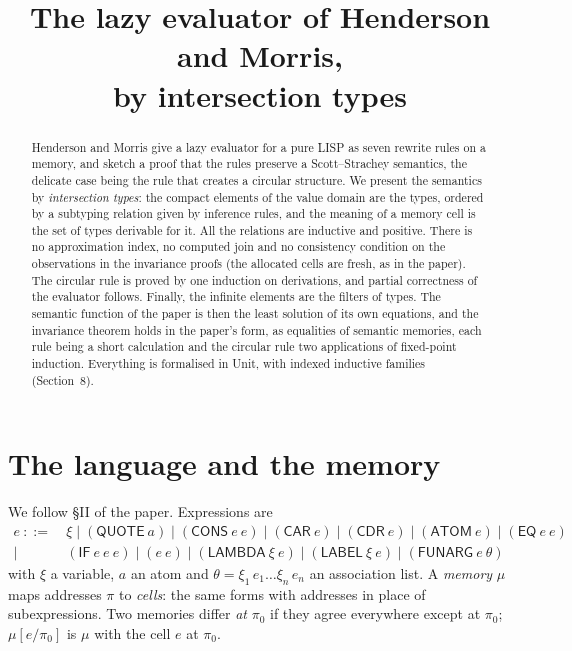 \documentclass[11pt]{amsart}
\title[The lazy evaluator by intersection types]{The lazy evaluator of Henderson and Morris,\\ by intersection types}
\date{}
\theoremstyle{definition}
\theoremstyle{remark}
\newcommand{\kw}[1]{\mathsf{#1}}
\begin{document}
\begin{abstract}
Henderson and Morris \cite{HM76} give a lazy
evaluator for a pure LISP as seven rewrite rules on a memory, and sketch a
proof that the rules preserve a Scott--Strachey semantics, the delicate
case being the rule that creates a circular structure. We present the
semantics by \emph{intersection types}: the compact elements of the value
domain are the types, ordered by a subtyping relation given by inference
rules, and the meaning of a memory cell is the set of types derivable for
it. All the relations are inductive and positive. There is no
approximation index, no computed join and no consistency condition on the
observations in the invariance proofs (the allocated cells are fresh, as in
the paper). The circular rule is proved by one induction on
derivations, and partial correctness of the evaluator follows.
Finally, the infinite elements are the filters of types. The semantic
function of the paper is then the least solution of its own equations, and
the invariance theorem holds in the paper's form, as equalities of semantic
memories, each rule being a short calculation and the circular rule two
applications of fixed-point induction. Everything is formalised in Unit,
with indexed inductive families (Section~8).
\end{abstract}
\maketitle

\section{The language and the memory}

We follow \S II of the paper. Expressions are
\[
\begin{aligned}
e\ ::=\ {}&\xi \mid (\kw{QUOTE}\ a)\mid(\kw{CONS}\ e\ e)\mid(\kw{CAR}\ e)\mid(\kw{CDR}\ e)\mid(\kw{ATOM}\ e)\mid(\kw{EQ}\ e\ e)\\
\mid{}&(\kw{IF}\ e\ e\ e)\mid(e\ e)\mid(\kw{LAMBDA}\ \xi\ e)\mid(\kw{LABEL}\ \xi\ e)\mid(\kw{FUNARG}\ e\ \theta)
\end{aligned}
\]
with $\xi$ a variable, $a$ an atom and $\theta=\xi_1\,e_1\dots\xi_n\,e_n$ an
association list. A \emph{memory} $\mu$ maps addresses $\pi$ to \emph{cells}:
the same forms with addresses in place of subexpressions. Two memories differ
\emph{at} $\pi_0$ if they agree everywhere except at $\pi_0$; $\mu[e/\pi_0]$
is $\mu$ with the cell $e$ at $\pi_0$.
\end{document}
